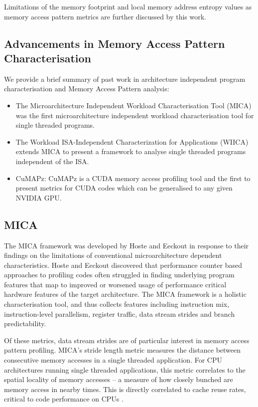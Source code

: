 \documentclass[review=false, sigchi]{acmart}
\begin{document}
	Limitations of the memory footprint and local memory address entropy values as memory access pattern metrics are further discussed by this work. %
	
	\subsection{Advancements in Memory Access Pattern Characterisation}
	
	We provide a brief summary of past work in architecture independent program characterisation and Memory Access Pattern analysis:
	
	\begin{itemize}
		\item The Microarchitecture Independent Workload Characterisation Tool (MICA) \cite{hoste2007microarchitecture} was the first microarchitecture independent workload characterisation tool for single threaded programs. 
		\item The Workload ISA-Independent Characterization for Applications (WIICA) \cite{shao2013isa} extends MICA to present a framework to analyse single threaded programs independent of the ISA.
		\item CuMAPz: CuMAPz \cite{kim2011cumapz} is a CUDA memory access profiling tool and the first to present metrics for CUDA codes which can be generalised to any given NVIDIA GPU.
	\end{itemize}
	
	\subsection{MICA}
	
	The MICA framework was developed by Hoste and Eeckout \cite{hoste2007microarchitecture} in response to their findings on the limitations of conventional microarchitecture dependent characteristics. Hoste and Eeckout discovered that performance counter based approaches to profiling codes often struggled in finding underlying program features that map to improved or worsened usage of performance critical hardware features of the target architecture. The MICA framework is a holistic characterisation tool, and thus collects features including instruction mix, instruction-level parallelism, register traffic, data stream strides and branch predictability.
	
	Of these metrics, data stream strides are of particular interest in memory access pattern profiling. MICA's stride length metric measures the distance between consecutive memory accesses in a single threaded application. For CPU architectures running single threaded applications, this metric correlates to the spatial locality of memory accesses -- a measure of how closely bunched are memory access in nearby times. This is directly correlated to cache reuse rates, critical to code performance on CPUs \cite{inteloptimisation}. %
	
\end{document}
